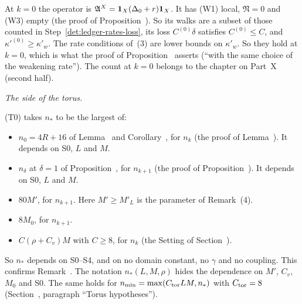 \begin{detail}
\begin{step}
At $k=0$ the operator is $\mathfrak A^X=\mathbf 1_X(\Delta_0+r)\mathbf 1_X$. It has (W1) local, $\mathfrak N=0$ and (W3) empty (the proof of Proposition~). So its walks are a subset of those counted in Step~\ref{det:ledger-rates-loss}, its loss $C^{(0)}\delta$ satisfies $C^{(0)}\le C$, and $\kappa'^{(0)}\ge\kappa'_w$. The rate conditions of~(3) are lower bounds on $\kappa'_w$. So they hold at $k=0$, which is what the proof of Proposition~ asserts (``with the same choice of the weakening rate''). The count at $k=0$ belongs to the chapter on Part~X (second half).
\end{step}
\end{detail}

\begin{detail}\label{det:ledger-torus}
\emph{The side of the torus.}

\begin{step}
(T0) takes $n_*$ to be the largest of:
\begin{itemize}
\item $n_0=4R+16$ of Lemma~ and Corollary~, for $n_k$ (the proof of Lemma~). It depends on S0, $L$ and $M$.
\item $n_\delta$ at $\delta=1$ of Proposition~, for $n_{k+1}$ (the proof of Proposition~). It depends on S0, $L$ and $M$.
\item $80M'$, for $n_{k+1}$. Here $M'\ge M'_L$ is the parameter of Remark~(4).
\item $8M_0$, for $n_{k+1}$.
\item $C(\rho+C_v)M$ with $C\ge8$, for $n_k$ (the Setting of Section~).
\end{itemize}
So $n_*$ depends on S0--S4, and on no domain constant, no $\gamma$ and no coupling. This confirms Remark~. The notation $n_*(L,M,\rho)$ hides the dependence on $M'$, $C_v$, $M_0$ and S0. The same holds for $n_{\min}=\max(C_{\rm tor}LM,n_*)$ with $C_{\rm tor}=8$ (Section~, paragraph ``Torus hypotheses'').
\end{step}


\end{detail}
